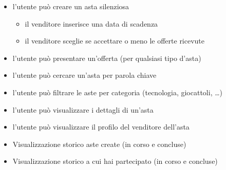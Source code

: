 \begin{itemize}
\begin{itemize}[label={\tiny$\blacksquare$}]
\begin{itemize}[label={\tiny$-$}]
		            \end{itemize}
	      \end{itemize}
	\item l'utente può creare un asta silenziosa
	      \begin{itemize}[label={\tiny$\blacksquare$}]
		      \item il venditore inserisce una data di scadenza
		      \item il venditore sceglie se accettare o meno le offerte ricevute
	      \end{itemize}
	      \medskip
	\item l'utente può presentare un'offerta (per qualsiasi tipo d'asta) \medskip

	\item l'utente può cercare un'asta per parola chiave
	\item l'utente può filtrare le aste per categoria (tecnologia, giocattoli, …) \medskip

	\item l'utente può visualizzare i dettagli di un'asta
	\item l'utente può visualizzare il profilo del venditore dell'asta \medskip

	\item Visualizzazione storico aste create (in corso e concluse)
	\item Visualizzazione storico a cui hai partecipato (in corso e concluse)
\end{itemize}

\newpage
